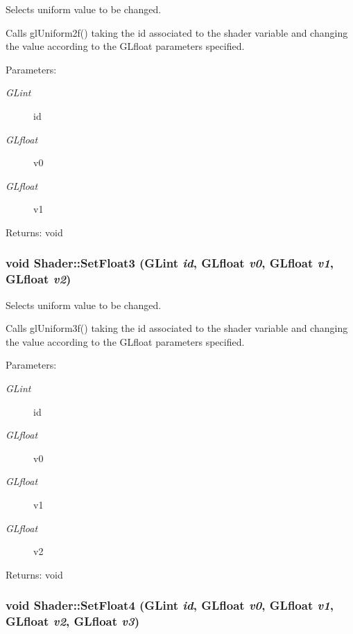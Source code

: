 Selects uniform value to be changed. 

Calls glUniform2f() taking the id associated to the shader variable and changing the value according to the GLfloat parameters specified.

\begin{Desc}
\item[Parameters:]
\begin{description}
\item[{\em GLint}]id \item[{\em GLfloat}]v0 \item[{\em GLfloat}]v1 \end{description}
\end{Desc}
\begin{Desc}
\item[Returns:]void \end{Desc}
\hypertarget{class_shader_439aaf809ad7287862907ab1a36f3849}{
\subsubsection[SetFloat3]{\setlength{\rightskip}{0pt plus 5cm}void Shader::SetFloat3 (GLint {\em id}, \/  GLfloat {\em v0}, \/  GLfloat {\em v1}, \/  GLfloat {\em v2})}}
\label{class_shader_439aaf809ad7287862907ab1a36f3849}


Selects uniform value to be changed. 

Calls glUniform3f() taking the id associated to the shader variable and changing the value according to the GLfloat parameters specified.

\begin{Desc}
\item[Parameters:]
\begin{description}
\item[{\em GLint}]id \item[{\em GLfloat}]v0 \item[{\em GLfloat}]v1 \item[{\em GLfloat}]v2 \end{description}
\end{Desc}
\begin{Desc}
\item[Returns:]void \end{Desc}
\hypertarget{class_shader_4be6e8b9886f58bc5615d2f736c8885c}{
\subsubsection[SetFloat4]{\setlength{\rightskip}{0pt plus 5cm}void Shader::SetFloat4 (GLint {\em id}, \/  GLfloat {\em v0}, \/  GLfloat {\em v1}, \/  GLfloat {\em v2}, \/  GLfloat {\em v3})}}
\label{class_shader_4be6e8b9886f58bc5615d2f736c8885c}


